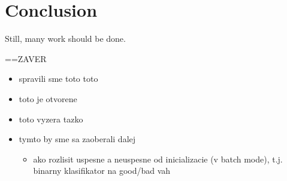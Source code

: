 \section*{Conclusion}

Still, many work should be done. 


==ZAVER 
\begin{itemize} 
\item   spravili sme toto toto
\item   toto je otvorene
\item   toto vyzera tazko
\item   tymto by sme sa zaoberali dalej 
\begin{itemize}
\item ako rozlisit uspesne a neuspesne od inicializacie (v batch mode), t.j. binarny klasifikator na good/bad vah 
\end{itemize} 

\end{itemize} 



